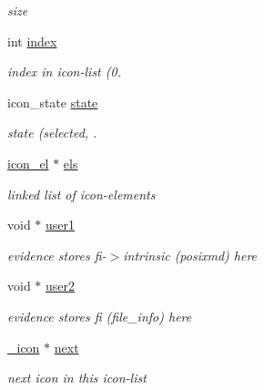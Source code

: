 \begin{CompactItemize}
\begin{CompactList}\small\item\em size \item\end{CompactList}\item 
int \hyperlink{struct__icon_o7}{index}
\begin{CompactList}\small\item\em index in icon-list (0. \item\end{CompactList}\item 
icon\_\-state \hyperlink{struct__icon_o8}{state}
\begin{CompactList}\small\item\em state (selected, . \item\end{CompactList}\item 
\hypertarget{struct__icon_o9}{
\hyperlink{struct__icon__el}{icon\_\-el} $\ast$ \hyperlink{struct__icon_o9}{els}}
\label{struct__icon_o9}

\begin{CompactList}\small\item\em linked list of icon-elements \item\end{CompactList}\item 
\hypertarget{struct__icon_o10}{
void $\ast$ \hyperlink{struct__icon_o10}{user1}}
\label{struct__icon_o10}

\begin{CompactList}\small\item\em evidence stores fi-$>$intrinsic (posixmd) here \item\end{CompactList}\item 
\hypertarget{struct__icon_o11}{
void $\ast$ \hyperlink{struct__icon_o11}{user2}}
\label{struct__icon_o11}

\begin{CompactList}\small\item\em evidence stores fi (file\_\-info) here \item\end{CompactList}\item 
\hypertarget{struct__icon_o12}{
\hyperlink{struct__icon}{\_\-icon} $\ast$ \hyperlink{struct__icon_o12}{next}}
\label{struct__icon_o12}

\begin{CompactList}\small\item\em next icon in this icon-list \item\end{CompactList}\end{CompactItemize}


